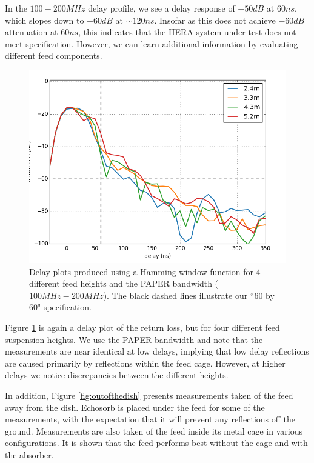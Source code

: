 \documentclass[12pt,preprint]{aastex}
\begin{document}
In the $100-200MHz$ delay profile, we see a delay response of $-50dB$ at $60ns$, which slopes down to $-60dB$ at $\sim120ns$.  Insofar as
this does not achieve $-60dB$ attenuation at $60ns$, this indicates that the HERA system under test does not meet specification. However, we can learn additional information by evaluating
different feed components. 

\begin{figure}[ht!]
\centering
\includegraphics[totalheight=0.4\textheight]{plots/delay_heights_paper.png}
\caption{Delay plots produced using a Hamming window function for 4 different feed heights and the PAPER bandwidth ($100MHz-200MHz$). The black dashed lines illustrate our ``60 by 60" specification.}
\label{fig:elevator}
\end{figure}


Figure \ref{fig:elevator} is again a delay plot of the return loss, but for
four different feed suspension heights. We use the PAPER bandwidth and note
that the measurements are near identical at low delays, implying that low delay
reflections are caused primarily by reflections within the feed cage. However,
at higher delays we notice discrepancies between the different heights.

In addition, Figure \ref{fig:outofthedish} presents measurements taken of the feed
away from the dish. Echosorb is placed under the feed for some of the
measurements, with the expectation that it will prevent any reflections off the
ground. Measurements are also taken of the feed inside its metal cage in
various configurations. It is shown that the feed performs best without the cage and with the absorber. 
\end{document}
